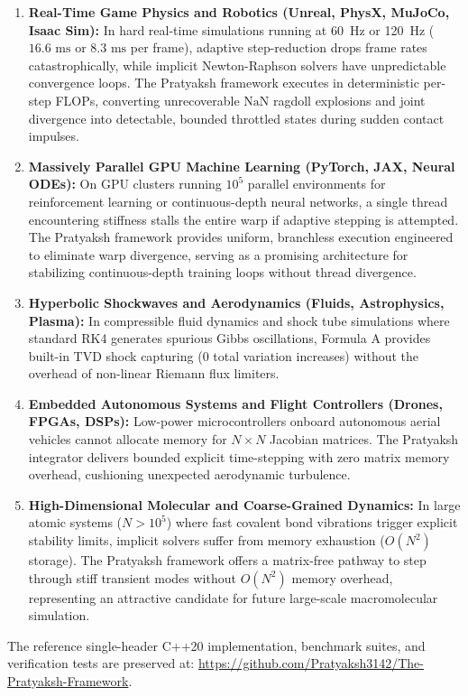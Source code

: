 \documentclass[11pt,a4paper]{article}
\theoremstyle{definition}
\begin{document}
\begin{enumerate}
    \item \textbf{Real-Time Game Physics and Robotics (Unreal, PhysX, MuJoCo, Isaac Sim):} In hard real-time simulations running at 60~Hz or 120~Hz ($16.6\text{ ms}$ or $8.3\text{ ms}$ per frame), adaptive step-reduction drops frame rates catastrophically, while implicit Newton-Raphson solvers have unpredictable convergence loops. The Pratyaksh framework executes in deterministic per-step FLOPs, converting unrecoverable $\text{NaN}$ ragdoll explosions and joint divergence into detectable, bounded throttled states during sudden contact impulses.
    \item \textbf{Massively Parallel GPU Machine Learning (PyTorch, JAX, Neural ODEs):} On GPU clusters running $10^5$ parallel environments for reinforcement learning or continuous-depth neural networks, a single thread encountering stiffness stalls the entire warp if adaptive stepping is attempted. The Pratyaksh framework provides uniform, branchless execution engineered to eliminate warp divergence, serving as a promising architecture for stabilizing continuous-depth training loops without thread divergence.
    \item \textbf{Hyperbolic Shockwaves and Aerodynamics (Fluids, Astrophysics, Plasma):} In compressible fluid dynamics and shock tube simulations where standard RK4 generates spurious Gibbs oscillations, Formula A provides built-in TVD shock capturing (0 total variation increases) without the overhead of non-linear Riemann flux limiters.
    \item \textbf{Embedded Autonomous Systems and Flight Controllers (Drones, FPGAs, DSPs):} Low-power microcontrollers onboard autonomous aerial vehicles cannot allocate memory for $N \times N$ Jacobian matrices. The Pratyaksh integrator delivers bounded explicit time-stepping with zero matrix memory overhead, cushioning unexpected aerodynamic turbulence.
    \item \textbf{High-Dimensional Molecular and Coarse-Grained Dynamics:} In large atomic systems ($N > 10^5$) where fast covalent bond vibrations trigger explicit stability limits, implicit solvers suffer from memory exhaustion ($O(N^2)$ storage). The Pratyaksh framework offers a matrix-free pathway to step through stiff transient modes without $O(N^2)$ memory overhead, representing an attractive candidate for future large-scale macromolecular simulation.
\end{enumerate}

The reference single-header C++20 implementation, benchmark suites, and verification tests are preserved at:
\url{https://github.com/Pratyaksh3142/The-Pratyaksh-Framework}.
\end{document}
